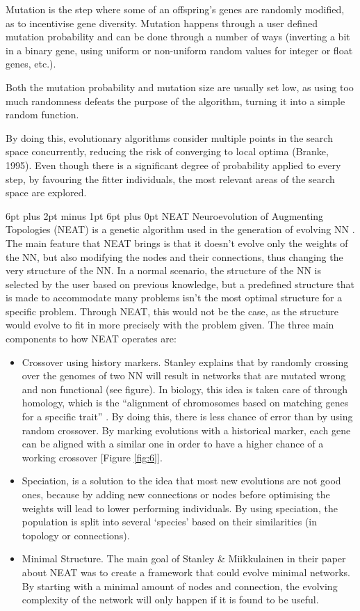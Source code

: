 \documentclass[12pt,a4paper]{article}
\makeatletter
\renewcommand\subsection{\@startsection {subsection}{1}{2mm} %
                               {6pt plus 2pt minus 1pt} %
                               {6pt plus 0pt} %
                               {\normalfont\bfseries}}
\makeatother
\begin{document}
Mutation is the step where some of an offspring’s genes are randomly modified, as to incentivise gene diversity. Mutation happens through a user defined mutation probability and can be done through a number of ways (inverting a bit in a binary gene, using uniform or non-uniform random values for integer or float genes, etc.).\par
Both the mutation probability and mutation size are usually set low, as using too much randomness defeats the purpose of the algorithm, turning it into a simple random function.\par
By doing this, evolutionary algorithms consider multiple points in the search space concurrently, reducing the risk of converging to local optima (Branke, 1995). Even though there is a significant degree of probability applied to every step, by favouring the fitter individuals, the most relevant areas of the search space are explored.\par

\subsection{NEAT}
Neuroevolution of Augmenting Topologies (NEAT) is a genetic algorithm used in the generation of evolving NN \cite{stanley_evolving_2002}. The main feature that NEAT brings is that it doesn’t evolve only the weights of the NN, but also modifying the nodes and their connections, thus changing the very structure of the NN. In a normal scenario, the structure of the NN is selected by the user based on previous knowledge, but a predefined structure that is made to accommodate many problems isn’t the most optimal structure for a specific problem. Through NEAT, this would not be the case, as the structure would evolve to fit in more precisely with the problem given.
The three main components to how NEAT operates are:
\begin{itemize}
	\item Crossover using history markers. Stanley explains that by randomly crossing over the genomes of two NN will result in networks that are mutated wrong and non functional (see figure). In biology, this idea is taken care of through homology, which is the “alignment of chromosomes based on matching genes for a specific trait” \cite{heidenreich_neat:_2019}. By doing this, there is less chance of error than by using random crossover. By marking evolutions with a historical marker, each gene can be aligned with a similar one in order to have a higher chance of a working crossover  [Figure \ref{fig:6}].
	\item Speciation, is a solution to the idea that most new evolutions are not good ones, because by adding new connections or nodes before optimising the weights will lead to lower performing individuals. By using speciation, the population is split into several ‘species’ based on their similarities (in topology or connections).
	\item Minimal Structure. The main goal of Stanley \& Miikkulainen in their paper about NEAT was to create a framework that could evolve minimal networks. By starting with a minimal amount of nodes and connection, the evolving complexity of the network will only happen if it is found to be useful.
\end{itemize}
\end{document}
